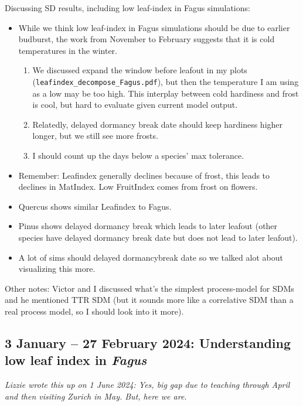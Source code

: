 \documentclass[11pt,letter]{article}
\begin{document}
Discussing SD results, including low leaf-index in Fagus simulations:
\begin{itemize}
\item While we think low leaf-index in Fagus simulations should be due to earlier budburst, the work from November to February suggests that it is cold temperatures in the winter. 
\begin{enumerate}
\item We discussed expand the window before leafout in my plots (\verb|leafindex_decompose_Fagus.pdf|), but then the temperature I am using as a low may be too high. This interplay between cold hardiness and frost is cool, but hard to evaluate given current model output.
\item Relatedly, delayed dormancy break date should keep hardiness higher longer, but we still see more frosts. 
\item I should count up the days below a species' max tolerance.
\end{enumerate}
\item Remember: Leafindex generally declines because of frost, this leads to declines in MatIndex. Low FruitIndex comes from frost on flowers.
\item Quercus shows similar Leafindex to Fagus.
\item Pinus shows delayed dormancy break which leads to later leafout (other species have delayed dormancy break date but does not lead to later leafout). 
\item A lot of sims should delayed dormancybreak date so we talked alot about visualizing this more. 
\end{itemize}


Other notes: Victor and I discussed what's the simplest process-model for SDMs and he mentioned TTR SDM (but it sounds more like a correlative SDM than a real process model, so I should look into it more).


\subsection{3 January -- 27 February 2024: Understanding low leaf index in \emph{Fagus}}
\emph{Lizzie wrote this up on 1 June 2024: Yes, big gap due to teaching through April and then visiting Zurich in May. But, here we are.}\\
\end{document}
